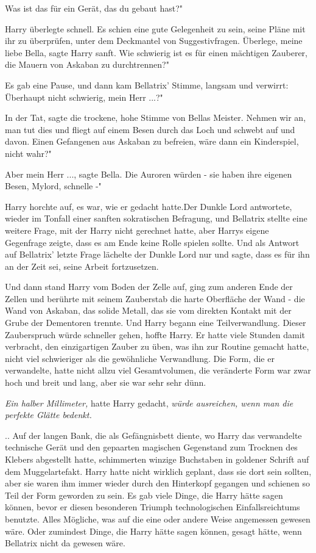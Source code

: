 \glqq Was ist das für ein Gerät, das du gebaut hast?"

Harry überlegte schnell. Es schien eine gute Gelegenheit zu sein, seine Pläne
mit ihr zu überprüfen, unter dem Deckmantel von Suggestivfragen. \glqq Überlege,
meine liebe Bella\grqq{}, sagte Harry sanft. \glqq Wie schwierig ist es für
einen mächtigen Zauberer, die Mauern von Askaban zu durchtrennen?"

Es gab eine Pause, und dann kam Bellatrix' Stimme, langsam und verwirrt: \glqq
Überhaupt nicht schwierig, mein Herr ...?"

\glqq In der Tat\grqq{}, sagte die trockene, hohe Stimme von Bellas Meister.
\glqq Nehmen wir an, man tut dies und fliegt auf einem Besen durch das Loch und
schwebt auf und davon. Einen Gefangenen aus Askaban zu befreien, wäre dann ein
Kinderspiel, nicht wahr?"

\glqq Aber mein Herr ...\grqq{}, sagte Bella. \glqq Die Auroren würden - sie
haben ihre eigenen Besen, Mylord, schnelle -"

Harry horchte auf, es war, wie er gedacht hatte.Der Dunkle Lord antwortete,
wieder im Tonfall einer sanften sokratischen Befragung, und Bellatrix stellte
eine weitere Frage, mit der Harry nicht gerechnet hatte, aber Harrys eigene
Gegenfrage zeigte, dass es am Ende keine Rolle spielen sollte. Und als Antwort
auf Bellatrix' letzte Frage lächelte der Dunkle Lord nur und sagte, dass es für
ihn an der Zeit sei, seine Arbeit fortzusetzen.

Und dann stand Harry vom Boden der Zelle auf, ging zum anderen Ende der Zellen
und berührte mit seinem Zauberstab die harte Oberfläche der Wand - die Wand von
Askaban, das solide Metall, das sie vom direkten Kontakt mit der Grube der
Dementoren trennte. Und Harry begann eine Teilverwandlung. Dieser Zauberspruch
würde schneller gehen, hoffte Harry. Er hatte viele Stunden damit verbracht, den
einzigartigen Zauber zu üben, was ihn zur Routine gemacht hatte, nicht viel
schwieriger als die gewöhnliche Verwandlung. Die Form, die er verwandelte, hatte
nicht allzu viel Gesamtvolumen, die veränderte Form war zwar hoch und breit und
lang, aber sie war sehr sehr dünn.

\emph{Ein halber Millimeter,} hatte Harry gedacht, \emph{würde ausreichen, wenn
man die perfekte Glätte bedenkt.}

.. Auf der langen Bank, die als Gefängnisbett diente, wo Harry das verwandelte
technische Gerät und den gepaarten magischen Gegenstand zum Trocknen des Klebers
abgestellt hatte, schimmerten winzige Buchstaben in goldener Schrift auf dem
Muggelartefakt. Harry hatte nicht wirklich geplant, dass sie dort sein sollten,
aber sie waren ihm immer wieder durch den Hinterkopf gegangen und schienen so
Teil der Form geworden zu sein. Es gab viele Dinge, die Harry hätte sagen
können, bevor er diesen besonderen Triumph technologischen Einfallsreichtums
benutzte. Alles Mögliche, was auf die eine oder andere Weise angemessen gewesen
wäre. Oder zumindest Dinge, die Harry hätte sagen können, gesagt hätte, wenn
Bellatrix nicht da gewesen wäre.

